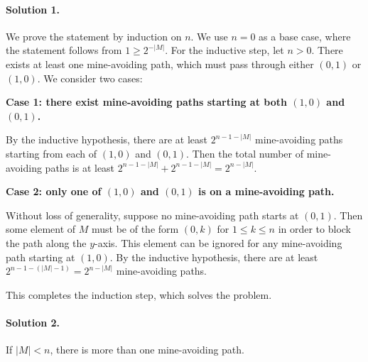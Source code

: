 \documentclass[11pt]{scrartcl}
\begin{document}
\paragraph{Solution 1.}
We prove the statement by induction on $n$. We use $n=0$ as a base case, where
the statement follows from $1\geq 2^{-|M|}$. For the inductive step, let $n >
0$. There exists at least one mine-avoiding path, which must pass through either
$(0, 1)$ or $(1, 0)$. We consider two cases:

\textbf{Case 1: there exist mine-avoiding paths starting at both $(1, 0)$ and
$(0, 1)$.}

By the inductive hypothesis, there are at least $2^{n-1-|M|}$ mine-avoiding
paths starting from each of $(1, 0)$ and $(0, 1)$. Then the total number of
mine-avoiding paths is at least $2^{n-1-|M|}+2^{n-1-|M|}=2^{n-|M|}$.

\textbf{Case 2: only one of $(1, 0)$ and $(0, 1)$ is on a mine-avoiding path.}

Without loss of generality, suppose no mine-avoiding path starts at $(0, 1)$.
Then some element of $M$ must be of the form $(0, k)$ for $1\leq k\leq n$ in
order to block the path along the $y$-axis. This element can be ignored for any
mine-avoiding path starting at $(1, 0)$. By the inductive hypothesis, there are
at least $2^{n-1-(|M|-1)}=2^{n-|M|}$ mine-avoiding paths.

This completes the induction step, which solves the problem.

\paragraph{Solution 2.}

\begin{lemma*}
  If $|M|<n$, there is more than one mine-avoiding path.
\end{lemma*}
\end{document}
